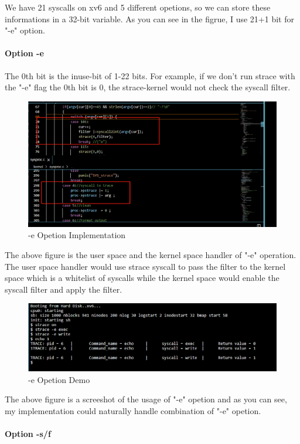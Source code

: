 \documentclass[11pt,oneside,a4paper]{article}
\begin{document}
We have 21 syscalls on xv6 and 5 different opetions, so we can store these informations
in a 32-bit variable. As you can see in the figrue, I use 21+1 bit for "-e" option. 


\paragraph*{Option -e}
The 0th bit is the inuse-bit of 1-22 bits. For example, if we don't run strace with
the "-e" flag the 0th bit is 0, the strace-kernel would not check the syscall filter.

\begin{figure}[H]
    \includegraphics[width=4.75in]{1-20.png}
    \centering
    \caption{-e Opetion Implementation}
\end{figure}

The above figure is the user space and the kernel space handler of "-e" operation.
The user space handler would use strace syscall to pass the filter to the kernel space 
which is a whitelist of syscalls while the kernel space would enable the syscall filter 
and apply the filter. 

\begin{figure}[H]
    \includegraphics[width=4.75in]{1-21.png}
    \centering
    \caption{-e Opetion Demo}
\end{figure}


The above figure is a screeshot of the usage of "-e" opetion and as you can see, 
my implementation could naturally handle combination of "-e" opetion.

\paragraph*{Option -s/f}
\end{document}
